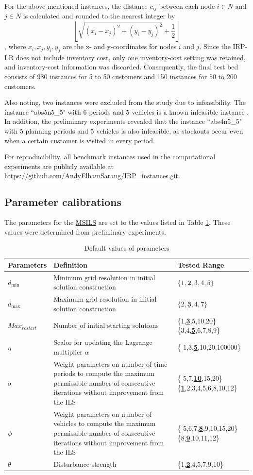 \documentclass{article}
\begin{document}
For the above-mentioned instances, the distance $c_{ij}$ between each node $i\in N$ and $j\in N$ is calculated and rounded to the nearest integer by \[ \left\lfloor \sqrt{(x_i-x_j)^2 + (y_i-y_j)^2} +\frac{1}{2} \right\rfloor \], where $x_i,x_j,y_i,y_j$ are the x- and y-coordinates for nodes $i$ and $j$. Since the IRP-LR does not include inventory cost, only one inventory-cost setting was retained, and inventory-cost information was discarded. Consequently, the final test bed consists of 980 instances for 5 to 50 customers and 150 instances for 50 to 200 customers. 

Also noting, two instances were excluded from the study due to infeasibility. The instance ``abs5n5\_5" with 6 periods and 5 vehicles is a known infeasible instance \cite{alvarez2018iterated}. In addition, the preliminary experiments revealed that the instance ``abs4n5\_5" with 5 planning periods and 5 vehicles is also infeasible, as stockouts occur even when a certain customer is visited in every period.

For reproducibility, all benchmark instances used in the computational experiments are publicly 
available at \url{https://github.com/AndyElhamSarang/IRP_instances.git}.

\subsection{Parameter calibrations}


The parameters for the \hyperref[alg:MSILS]{MSILS} are set to the values listed in Table \ref{default parameters}. These values were determined from preliminary experiments.

\begin{table}[H]
\caption{Default values of parameters}
\label{default parameters}
\centering
\begin{tabular}{ p{2cm}p{8cm}p{5cm}}
\toprule%
\textbf{Parameters} & \textbf{Definition} &\textbf{Tested Range} \tabularnewline
\hline
$d_{\min}$&  Minimum grid resolution in initial solution construction & $\{1,\underline{\textbf{2}},3,4,5\}$ \tabularnewline
$d_{\max}$&  Maximum grid resolution in initial solution construction & $\{2,\underline{\textbf{3}},4,7\}$ \tabularnewline
$Max_{restart}$ &  Number of initial starting solutions & \{1,\underline{\textbf{3}},5,10,20\} \{3,4,\underline{\textbf{5}},6,7,8,9\} \tabularnewline
$\eta$ & Scalor for updating the Lagrange multiplier $\alpha$ & \{ 1,3,\underline{\textbf{5}},10,20,100000\} \tabularnewline
$\sigma$ & Weight parameters on number of time periods to compute the maximum permissible number of consecutive iterations without improvement from the ILS &\{ 5,7,\underline{\textbf{10}},15,20\}\{\underline{\textbf{1}},2,3,4,5,6,8,10,12\} \tabularnewline
$\phi$ &  Weight parameters on number of vehicles to compute the maximum permissible number of consecutive iterations without improvement from the ILS& \{ 5,6,7,\underline{\textbf{8}},9,10,15,20\}\{8,\underline{\textbf{9}},10,11,12\} \tabularnewline
$\theta$ & Disturbance strength & \{1,\underline{\textbf{2}},4,5,7,9,10\}\tabularnewline
\hline
\end{tabular}
\end{table}
\end{document}
